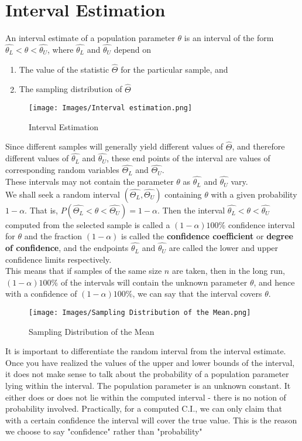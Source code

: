 \section{Interval Estimation}
An interval estimate of a population parameter $\theta$ is an interval of the form $\hat{\theta_L} < \theta < \hat{\theta_U}$, where $\hat{\theta_L}$ and $\hat{\theta_U}$ depend on 
\begin{enumerate}
    \item The value of the statistic $\hat{\Theta}$ for the particular sample, and
    \item The sampling distribution of $\hat{\Theta}$
\end{enumerate}
\begin{figure}
    \centering
    \texttt{[image: Images/Interval estimation.png]}
    \caption{Interval Estimation}
    \label{fig:my_label}
\end{figure}
Since different samples will generally yield different values of $\hat{\Theta}$, and therefore different values of $\hat{\theta_L}$ and $\hat{\theta_U}$, these end points of the interval are values of corresponding random variables $\hat{\Theta_L}$ and $\hat{\Theta_U}$. \\
These intervals may not contain the parameter $\theta$ as $\hat{\theta_L}$ and $\hat{\theta_U}$ vary. \\
We shall seek a random interval $(\hat{\Theta_L}, \hat{\Theta_U})$ containing $\theta$ with a given probability $1 - \alpha$. That is, $P(\hat{\Theta_L} < \theta < \hat{\Theta_U}) = 1 - \alpha$. Then the interval $\hat{\theta_L} < \theta < \hat{\theta_U}$ computed from the selected sample is called a $(1 - \alpha)100\%$ confidence interval for $\theta$ and the fraction $(1 - \alpha)$ is called the \textbf{confidence coefficient} or \textbf{degree of confidence}, and the endpoints $\hat{\theta_L}$ and $\hat{\theta_U}$ are called the lower and upper confidence limits respectively. \\
This means that if samples of the same size $n$ are taken, then in the long run, $(1 - \alpha)100\%$ of the intervals will contain the unknown parameter $\theta$, and hence with a confidence of $(1 - \alpha)100\%$, we can say that the interval covers $\theta$.
\begin{figure}
    \centering
    \texttt{[image: Images/Sampling Distribution of the Mean.png]}
    \caption{Sampling Distribution of the Mean}
    \label{fig:my_label}
\end{figure}
\begin{note}
\end{note}
It is important to differentiate the random interval from the interval estimate. Once you have realized the values of the upper and lower bounds of the interval, it does not make sense to talk about the probability of a population parameter lying within the interval. The population parameter is an unknown constant. It either does or does not lie within the computed interval - there is no notion of probability involved. Practically, for a computed C.I., we can only claim that with a certain confidence the interval will cover the true value. This is the reason we choose to say "confidence" rather than "probability"

